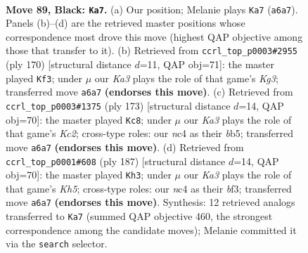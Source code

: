 \documentclass[11pt]{article}
\begin{document}
\clearpage

\begin{figure}[p]\centering
\begin{subfigure}{0.46\textwidth}\centering
\resizebox{\linewidth}{!}{%
\newchessgame
\chessboard[
  setfen={8/8/kR6/5K2/2N5/8/6P1/3r4 b - - 43 89},
  showmover=false,
  pgfstyle=straightmove, color=movearrow, markmove={a6-a7}
]}
\caption{}
\end{subfigure}\hfill
\begin{subfigure}{0.46\textwidth}\centering
\resizebox{\linewidth}{!}{%
\newchessgame
\chessboard[
  setfen={8/8/5pk1/8/8/4n1KP/6r1/R7 w - - 0 86},
  showmover=false,
  pgfstyle=straightmove, color=movearrow, markmove={g3-f3}
]}
\caption{}
\end{subfigure}
\\[4pt]
\begin{subfigure}{0.46\textwidth}\centering
\resizebox{\linewidth}{!}{%
\newchessgame
\chessboard[
  setfen={8/2kR4/1p6/1B6/8/2K5/8/6r1 b - - 9 87},
  showmover=false,
  pgfstyle=straightmove, color=movearrow, markmove={c7-c8}
]}
\caption{}
\end{subfigure}\hfill
\begin{subfigure}{0.46\textwidth}\centering
\resizebox{\linewidth}{!}{%
\newchessgame
\chessboard[
  setfen={8/8/p7/4r3/6Rk/5B2/5K2/8 b - - 17 94},
  showmover=false,
  pgfstyle=straightmove, color=movearrow, markmove={h4-h3}
]}
\caption{}
\end{subfigure}
\caption{\textbf{Move 89, Black: \texttt{Ka7}.} (a) Our position; Melanie plays \texttt{Ka7} (\texttt{a6a7}). Panels (b)--(d) are the retrieved master positions whose correspondence most drove this move (highest QAP objective among those that transfer to it). (b) Retrieved from \texttt{ccrl\_top\_p0003\#2955} (ply 170) [structural distance $d$=11, QAP obj=71]: the master played \texttt{Kf3}; under $\mu$ our \emph{Ka3} plays the role of that game's \emph{Kg3}; transferred move \texttt{a6a7} \textbf{(endorses this move)}. (c) Retrieved from \texttt{ccrl\_top\_p0003\#1375} (ply 173) [structural distance $d$=14, QAP obj=70]: the master played \texttt{Kc8}; under $\mu$ our \emph{Ka3} plays the role of that game's \emph{Kc2}; cross-type roles: our \emph{n}c4 as their \emph{b}b5; transferred move \texttt{a6a7} \textbf{(endorses this move)}. (d) Retrieved from \texttt{ccrl\_top\_p0001\#608} (ply 187) [structural distance $d$=14, QAP obj=70]: the master played \texttt{Kh3}; under $\mu$ our \emph{Ka3} plays the role of that game's \emph{Kh5}; cross-type roles: our \emph{n}c4 as their \emph{b}f3; transferred move \texttt{a6a7} \textbf{(endorses this move)}. Synthesis: 12 retrieved analogs transferred to \texttt{Ka7} (summed QAP objective 460, the strongest correspondence among the candidate moves); Melanie committed it via the \texttt{search} selector.}
\label{fig:thought-m177}
\end{figure}
\end{document}
